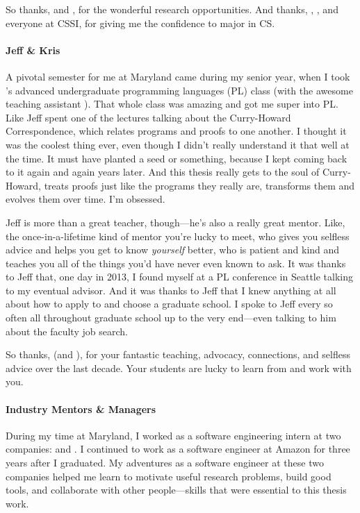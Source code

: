 So thanks,  and , for the wonderful research opportunities.
And thanks, , , and everyone at  CSSI, for giving me the confidence to major in CS.

\paragraph{Jeff \& Kris}
A pivotal semester for me at Maryland came during my senior year, when I took 's advanced undergraduate programming languages (PL) class
(with the awesome teaching assistant ).
That whole class was amazing and got me super into PL.
Like Jeff spent one of the lectures talking about the Curry-Howard Correspondence,
which relates programs and proofs to one another.
I thought it was the coolest thing ever, even though I didn't really understand it that well at the time.
It must have planted a seed or something, because I kept coming back to it again and again years later.
And this thesis really gets to the soul of Curry-Howard, treats proofs just like the programs they really are,
transforms them and evolves them over time.
I'm obsessed.

Jeff is more than a great teacher, though---he's also a really great mentor.
Like, the once-in-a-lifetime kind of mentor you're lucky to meet, who gives you selfless advice and helps you get to know \textit{yourself} better,
who is patient and kind and teaches you all of the things you'd have never even known to ask.
It was thanks to Jeff that, one day in 2013, I found myself at a PL conference in Seattle talking to my eventual advisor.
And it was thanks to Jeff that I knew anything at all about how to apply to and choose a graduate school.
I spoke to Jeff every so often all throughout graduate school up to the very 
end---even talking to him about the faculty job search.

So thanks,  (and ), for your fantastic teaching, advocacy, connections, and selfless advice over the last decade.
Your students are lucky to learn from and work with you.

\paragraph{Industry Mentors \& Managers}
During my time at Maryland, I worked as a software engineering intern at two companies:
 and .
I continued to work as a software engineer at Amazon for three years after I graduated.
My adventures as a software engineer at these two companies helped me learn to motivate useful research problems,
build good tools, and collaborate with other people---skills that were essential to this thesis work.

